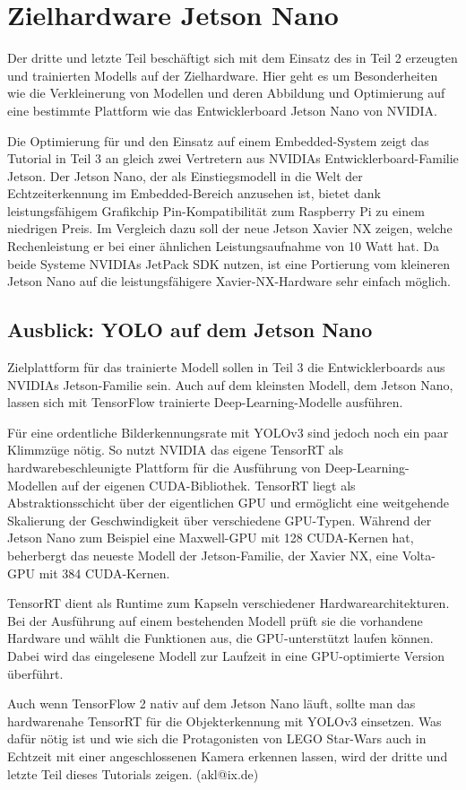 \chapter{Zielhardware Jetson Nano}

Der dritte und letzte Teil beschäftigt sich mit dem Einsatz des in Teil 2 erzeugten und trainierten Modells auf der Zielhardware. Hier geht es um Besonderheiten wie die Verkleinerung von Modellen und deren Abbildung und Optimierung auf eine bestimmte Plattform wie das Entwickler­board Jetson Nano von NVIDIA. 


Die Optimierung für und den Einsatz auf einem Embedded-System zeigt das Tutorial in Teil 3 an gleich zwei Vertretern aus NVIDIAs Entwicklerboard-Familie Jetson. Der Jetson Nano, der als Einstiegsmodell in die Welt der Echtzeiterkennung im Embedded-Bereich anzusehen ist, bietet dank leistungsfähigem Grafikchip Pin-Kompatibilität zum Raspberry Pi zu einem niedrigen Preis. Im Vergleich dazu soll der neue Jetson Xavier NX zeigen, welche Rechenleistung er bei einer ähnlichen Leistungsaufnahme von 10 Watt hat. Da beide Systeme NVIDIAs JetPack SDK nutzen, ist eine Portierung vom kleineren Jetson Nano auf die leistungsfähigere Xavier-NX-Hardware sehr einfach möglich.  

\section{Ausblick: YOLO auf dem Jetson Nano}

Zielplattform für das trainierte Modell sollen in Teil 3 die Entwicklerboards aus NVIDIAs Jetson-Familie sein. Auch auf dem kleinsten Modell, dem Jetson Nano, lassen sich mit TensorFlow trainierte Deep-­Learning-Modelle ausführen.  

Für eine ordentliche Bilderkennungsrate mit YOLOv3 sind jedoch noch ein paar Klimmzüge nötig. So nutzt NVIDIA das eigene TensorRT als hardwarebeschleunigte Plattform für die Ausführung von Deep-Learning-Modellen auf der eigenen CUDA-Bibliothek. TensorRT liegt als Abstraktionsschicht über der eigent­lichen GPU und ermöglicht eine weitgehende Skalierung der Geschwindigkeit über verschiedene GPU-Typen. Während der Jetson Nano zum Beispiel eine Maxwell-GPU mit 128 CUDA-Kernen hat, beherbergt das neueste Modell der Jetson-­Familie, der Xavier NX, eine Volta-GPU mit 384 CUDA-Kernen. 

TensorRT dient als Runtime zum Kapseln verschiedener Hardwarearchitekturen. Bei der Ausführung auf einem bestehenden Modell prüft sie die vorhandene Hardware und wählt die Funktionen aus, die GPU-unterstützt laufen können. Dabei wird das eingelesene Modell zur Laufzeit in eine GPU-optimierte Version überführt. 

Auch wenn TensorFlow 2 nativ auf dem Jetson Nano läuft, sollte man das hardwarenahe TensorRT für die Objekterkennung mit YOLOv3 einsetzen. Was dafür nötig ist und wie sich die Protagonisten von LEGO Star-Wars auch in Echtzeit mit einer angeschlossenen Kamera erkennen lassen, wird der dritte und letzte Teil dieses Tutorials zeigen. (akl@ix.de) 

